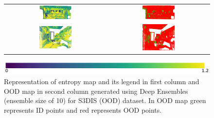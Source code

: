 \begin{figure}[h!]
\begin{tabular}{cc}
            \includegraphics[width=0.33\textwidth, height=0.18\textheight]{images/ood_imgs/de_s3dis/pnt_1_de_ent.pdf}& 
            \includegraphics[width=0.33\textwidth, height=0.18\textheight]{images/ood_imgs/de_s3dis/de_ent_3.pdf}\\

            \includegraphics[width=0.33\textwidth, height=0.18\textheight]{images/ood_imgs/de_s3dis/ofc_42_de_ent.pdf}& 
            \includegraphics[width=0.33\textwidth, height=0.18\textheight]{images/ood_imgs/de_s3dis/de_ent_1.pdf}\\
        \end{tabular}
        \includegraphics[scale=0.45]{images/ent_legend.pdf}
        \caption{Representation of entropy map and its legend in first column and OOD map in second column generated using Deep Ensembles (ensemble size of 10) for S3DIS (OOD) dataset. In OOD map green represents ID points and red represents OOD points.}
        \label{fig:de_s3dis_oodmap_ent}
    \end{figure}
